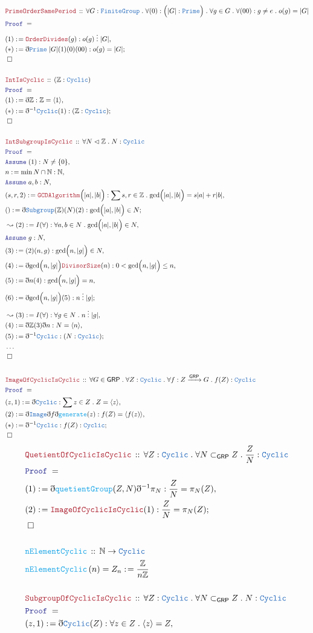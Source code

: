 \documentclass[12pt]{scrartcl}
\newcommand{\TYPE}[1]{\textcolor{NavyBlue}{\mathtt{#1}}}
\newcommand{\FUNC}[1]{\textcolor{Cerulean}{\mathtt{#1}}}
\newcommand{\LOGIC}[1]{\textcolor{Blue}{\mathtt{#1}}}
\newcommand{\THM}[1]{\textcolor{Maroon}{\mathtt{#1}}}
\renewcommand{\.}{\; . \;}
\newcommand{\de}{: \kern 0.1pc =}
\newcommand{\Act}[1]{\left( #1 \right)}
\newcommand{\Theorem}[2]{& \THM{#1} \, :: \, #2 \\ & \Proof = \\ }
\newcommand{\DeclareFunc}[2]{& \FUNC{#1} \, :: \, #2 \\}
\newcommand{\DefineNamedFunc}[4]{&  \FUNC{#1}\Act{#2} = #3 \de #4 \\}
\newcommand{\Page}[1]{ \begin{align*} #1 \end{align*}   }
\newcommand{ \bd }{ \ByDef }
\newcommand{\NoProof}{ & \ldots \\ \EndProof}
\newcommand{\Int}{\mathbb{Z} }
\newcommand{\Nat}{\mathbb{N} }
\newcommand{\Say}[3]{& #1 \de #2 : #3, \\}
\newcommand{\Conclude}[3]{& #1 \de #2 : #3; \\}
\newcommand{\Derive}[3]{& \leadsto #1 \de #2 : #3, \\}
\newcommand{\Assume}[2]{& \LOGIC{Assume} \; #1 : #2, \\}
\newcommand{\QED}{\; \square}
\newcommand{\EndProof}{& \QED \\}
\newcommand{\ByDef}{\eth}
\newcommand{\Proof}{\LOGIC{Proof} \; }
\newcommand{\Sgrp}{\subset_{\mathsf{GRP}}}
\newcommand{\Nrml}{\vartriangleleft}
\newcommand{\FG}{\TYPE{FiniteGroup}}
\newcommand{\GRP}{\mathsf{GRP}}
\begin{document}
\Page{
	\Theorem{PrimeOrderSamePeriod}{\forall G : \FG \. \forall (0) : \Big( |G| : \TYPE{Prime} \Big) 
		\. \forall g \in G \. \forall (00) : g \neq e \. o(g) = |G|
	}
 \Say{(1)}{ \THM{OrderDivides}(g)}{ o(g) \; \vdots \; |G|}
 \Conclude{(*)}{\bd \TYPE{Prime} \; |G|(1)(0)(00) }{ o(g) = |G| }
 \EndProof
\\
\Theorem{IntIsCyclic}{(\Int : \TYPE{Cyclic})}
\Say{(1)}{\bd \Int}{ \Int = \langle 1 \rangle}
\Conclude{(*)}{\bd^{-1} \TYPE{Cyclic}(1)}{(\Int : \TYPE{Cyclic})}
\EndProof
\\
\Theorem{IntSubgroupIsCyclic}{ \forall N \Nrml \Int \. N : \TYPE{Cyclic}}
\Assume{(1)}{N \neq \{0\}}
\Say{n}{\min  N \cap \Nat }{ \Nat}
\Assume{a,b}{N}
\Say{(s,r,2)}{\THM{GCDAlgorithm}\Big(|a|,|b|\Big)}{\sum s,r \in \Int \. \mathrm{gcd}\Big(|a|,|b|\Big) = s|a| + r|b|}
\Conclude{()}{\bd \TYPE{Subgroup}(\Int)(N)(2) }{ \mathrm{gcd}\Big(|a|,|b|\Big) \in N  }
\Derive{(2)}{I(\forall)}{\forall a, b \in N \. \mathrm{gcd}\Big(|a|,|b|\Big) \in N}
\Assume{g}{N}
\Say{(3)}{(2)(n,g)}{ \mathrm{gcd}\Big( n, |g| \Big)  \in N}
\Say{(4)}{ \bd \mathrm{gcd}\Big( n, |g| \Big) \THM{DivisorSize}(n)  }{ 0 < \mathrm{gcd}\Big(n, |g| \Big) \le n }
\Say{(5)}{ \bd n (4)  }{ \mathrm{gcd}\Big(n, |g| \Big) = n }
\Conclude{(6)}{ \bd \mathrm{gcd}\Big(n, |g| \Big)(5) }{ n \; \vdots \; |g|}
\Derive{(3)}{I(\forall)}{\forall g \in N \. n \; \vdots \; |g|}
\Say{(4)}{\bd \Int(3)\bd n}{ N = \langle n \rangle   } 
\Conclude{(5)}{\bd^{-1} \TYPE{Cyclic}}{ (N : \TYPE{Cyclic})}
\NoProof
\\
\Theorem{ImageOfCyclicIsCyclic}{\forall G \in \GRP \. \forall Z : \TYPE{Cyclic} \. 
	\forall f : Z \xrightarrow{\GRP} G \.  f(Z) : \TYPE{Cyclic}	
}
\Say{(z,1)}{\bd \TYPE{Cyclic}}{\sum z \in Z \. Z = \langle z \rangle }
\Say{ (2) }{ \bd \TYPE{Image} \bd f \bd \FUNC{generate}(z)  }{   f(Z) = \langle f(z) \rangle           }
\Conclude{ (*) }{\bd^{-1} \TYPE{Cyclic}}{ f(Z) : \TYPE{Cyclic}}
\EndProof
}\Page{
\Theorem{QuetientOfCyclicIsCyclic}{\forall Z : \TYPE{Cyclic} \. \forall N \Sgrp Z \. \frac{Z}{N} : \TYPE{Cyclic}}
\Say{(1)}{\bd \FUNC{quetientGroup}(Z,N)\bd^{-1} \pi_N}{ \frac{Z}{N} = \pi_N(Z)}
\Conclude{(2)}{\THM{ImageOfCyclicIsCyclic}(1)}{ \frac{Z}{N} = \pi_N(Z)}
\EndProof
\\
\DeclareFunc{nElementCyclic}{\Nat \to \TYPE{Cyclic}}
\DefineNamedFunc{nElementCyclic}{n}{ Z_n}{\frac{\Int}{n\Int}}
\\
\Theorem{SubgroupOfCyclicIsCyclic}{\forall Z : \TYPE{Cyclic} \. \forall N \Sgrp Z \. N : \TYPE{Cyclic} }
\Say{(z,1) }{ \bd \TYPE{Cyclic}(Z) }{ \forall z \in Z \. \langle z \rangle = Z }
}
\end{document}
